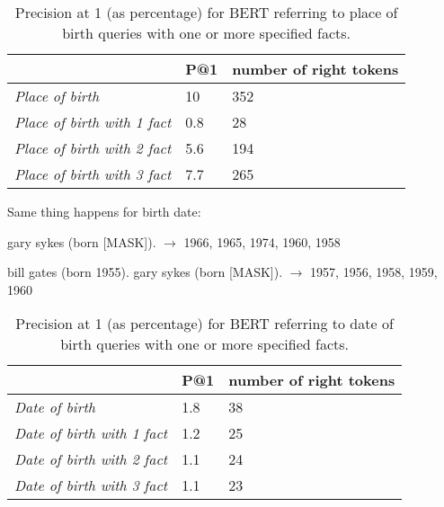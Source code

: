 \documentclass{article}
\begin{document}
\begin{table}[h!]
\centering
\begin{tabular}{l|l|l|}
\cline{2-3}
                          & P@1 & number of right tokens      \\ \hline
\multicolumn{1}{|l|}{\textit{Place of birth}} & 10 &  352   \\ \hline
\multicolumn{1}{|l|}{\textit{Place of birth with 1 fact}} & 0.8 & 28 \\ \hline
\multicolumn{1}{|l|}{\textit{Place of birth with 2 fact}} & 5.6 & 194 \\ \hline
\multicolumn{1}{|l|}{\textit{Place of birth with 3 fact}} & 7.7 &  265   \\ \hline
\end{tabular}
\caption{Precision at 1 (as percentage) for BERT referring to place of birth queries with one or more specified facts.}
\label{table: precision at 1 with one or more facts pob}
\end{table}

Same thing happens for birth date:
\begin{center}
gary sykes (born [MASK]). $\rightarrow$ 1966, 1965, 1974, 1960, 1958
\end{center}
\begin{center}
bill gates (born 1955). gary sykes (born [MASK]). $\rightarrow$ 1957, 1956, 1958, 1959, 1960
\end{center}

\begin{table}[h!]
\centering
\begin{tabular}{l|l|l|}
\cline{2-3}
                          & P@1 & number of right tokens      \\ \hline
\multicolumn{1}{|l|}{\textit{Date of birth}} & 1.8 &  38   \\ \hline
\multicolumn{1}{|l|}{\textit{Date of birth with 1 fact}} & 1.2 & 25 \\ \hline
\multicolumn{1}{|l|}{\textit{Date of birth with 2 fact}} & 1.1 & 24 \\ \hline
\multicolumn{1}{|l|}{\textit{Date of birth with 3 fact}} & 1.1 &  23   \\ \hline
\end{tabular}
\caption{Precision at 1 (as percentage) for BERT referring to date of birth queries with one or more specified facts.}
\label{table: precision at 1 with one or more facts dob}
\end{table}
\end{document}

